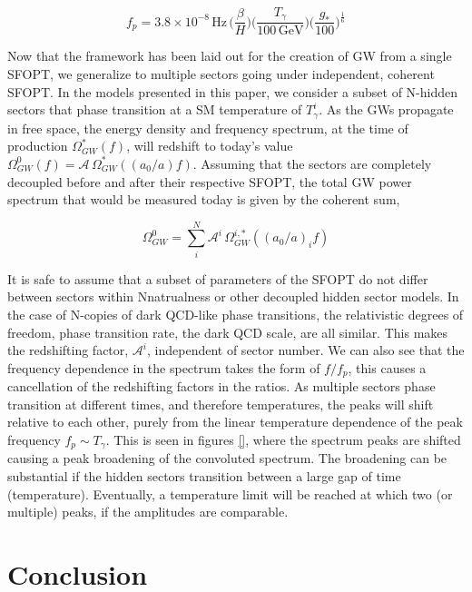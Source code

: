 \documentclass[nofootinbib,twocolumn,preprintnumbers]{revtex4-1}
\begin{document}
\begin{equation}
f_{p} = 3.8 \times 10^{-8} \, \textrm{Hz}\, \bigg( \frac{\beta}{H}\bigg)\bigg(\frac{T_{\gamma}}{100 \, \textrm{GeV}}\bigg)\bigg(\frac{g_{*}}{100}\bigg)^{\frac{1}{6}}
\end{equation}

 Now that the framework has been laid out for the creation of GW from a single SFOPT, we generalize to multiple sectors going under independent, coherent SFOPT. In the models presented in this paper, we consider a subset of N-hidden sectors that phase transition at a SM temperature of $T_{\gamma}^{i}$. As the GWs propagate in free space, the energy density and frequency spectrum, at the time of production $\Omega_{GW}^{*}(f)$, will redshift to today's value $\Omega_{GW}^{0}(f) = \mathcal{A}\, \Omega_{GW}^{*}((a_{0}/a) f) $.  Assuming that the sectors are completely decoupled before and after their respective SFOPT, the total GW power spectrum that would be measured today is given by the coherent sum,

\begin{equation}
\Omega_{GW}^{0} =  \sum_{i}^{N} \mathcal{A}^{i}\, \Omega_{GW}^{i,*}((a_{0}/a)_{i} f) 
\end{equation}

It is safe to assume that a subset of parameters of the SFOPT do not differ between sectors within Nnatrualness or other decoupled hidden sector models. In the case of N-copies of dark QCD-like phase transitions, the relativistic degrees of freedom, phase transition rate,  the dark QCD scale, are all similar. This makes the redshifting factor, $\mathcal{A}^i$, independent of sector number. We can also see that the frequency dependence in the spectrum takes the form of $f/f_{p}$, this causes a cancellation of the redshifting factors in the ratios. As multiple sectors phase transition at different times, and therefore temperatures, the peaks will shift relative to each other, purely from the linear temperature dependence of the peak frequency $f_{p} \sim T_{\gamma}$.  This is seen in figures \ref{}, where the spectrum peaks are shifted causing a peak broadening of the convoluted spectrum. The broadening can be substantial if the hidden sectors transition between a large gap of time (temperature). Eventually, a temperature limit will be reached at which two (or multiple) peaks, if the amplitudes are comparable. 


\section{Conclusion}
\label{sec:conclusion}


\appendix



\end{document}
